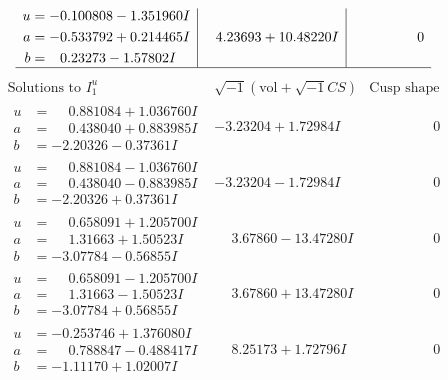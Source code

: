 \documentclass[1p]{elsarticle_modified}
\theoremstyle{definition}
\newcommand{\I}{\sqrt{-1}}
\begin{document}
$$\begin{array}{c|c|c}
\begin{aligned}
u &= -0.100808 - 1.351960 I \\
a &= -0.533792 + 0.214465 I \\
b &= \phantom{-}0.23273 - 1.57802 I\end{aligned}
 & \phantom{-}4.23693 + 10.48220 I & \phantom{-0.000000 } 0\\
 \hline 
 \end{array}$$\newpage$$\begin{array}{c|c|c}  
\text{Solutions to }I^u_{1}& \I (\text{vol} + \sqrt{-1}CS) & \text{Cusp shape}\\
 \hline 
\begin{aligned}
u &= \phantom{-}0.881084 + 1.036760 I \\
a &= \phantom{-}0.438040 + 0.883985 I \\
b &= -2.20326 - 0.37361 I\end{aligned}
 & -3.23204 + 1.72984 I & \phantom{-0.000000 } 0 \\ \hline\begin{aligned}
u &= \phantom{-}0.881084 - 1.036760 I \\
a &= \phantom{-}0.438040 - 0.883985 I \\
b &= -2.20326 + 0.37361 I\end{aligned}
 & -3.23204 - 1.72984 I & \phantom{-0.000000 } 0 \\ \hline\begin{aligned}
u &= \phantom{-}0.658091 + 1.205700 I \\
a &= \phantom{-}1.31663 + 1.50523 I \\
b &= -3.07784 - 0.56855 I\end{aligned}
 & \phantom{-}3.67860 - 13.47280 I & \phantom{-0.000000 } 0 \\ \hline\begin{aligned}
u &= \phantom{-}0.658091 - 1.205700 I \\
a &= \phantom{-}1.31663 - 1.50523 I \\
b &= -3.07784 + 0.56855 I\end{aligned}
 & \phantom{-}3.67860 + 13.47280 I & \phantom{-0.000000 } 0 \\ \hline\begin{aligned}
u &= -0.253746 + 1.376080 I \\
a &= \phantom{-}0.788847 - 0.488417 I \\
b &= -1.11170 + 1.02007 I\end{aligned}
 & \phantom{-}8.25173 + 1.72796 I & \phantom{-0.000000 } 0 \\ \hline\begin{aligned}

\end{aligned}
\end{array}$$
\end{document}
